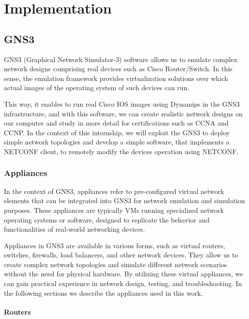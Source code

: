 \chapter{Implementation} \label{chap:impl}

\section{GNS3}

GNS3 (Graphical Network Simulator-3) software allows us to emulate complex network designs comprising real devices such as Cisco Router/Switch. In this sense, the emulation framework provides virtualization solutions over which actual images of the operating system of such devices can run.

This way, it enables to run real Cisco IOS images using Dynamips in the GNS3 infrastructure, and with this software, we can create realistic network designs on our computer and study in more detail for certifications such as \gls{CCNA} and  \gls{CCNP}. In the context of this internship, we will exploit the GNS3 to deploy simple network topologies and develop a simple software, that implements a NETCONF client, to remotely modify the devices operation using NETCONF.


\subsection{Appliances}
In the context of GNS3, appliances refer to pre-configured virtual network elements that can be integrated into GNS3 for network emulation and simulation purposes. These appliances are typically \gls{VMs} running specialized network operating systems or software, designed to replicate the behavior and functionalities of real-world networking devices.

Appliances in GNS3 are available in various forms, such as virtual routers, switches, firewalls, load balancers, and other network devices. They allow us to create complex network topologies and simulate different network scenarios without the need for physical hardware. By utilizing these virtual appliances, we can gain practical experience in network design, testing, and troubleshooting. In the following sections we describe the appliances used in this work.


\subsubsection{Routers}

